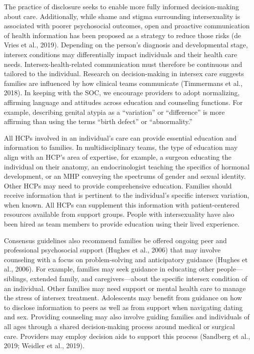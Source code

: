 \documentclass[
]{book}
\begin{document}
The practice of disclosure seeks to enable more
fully informed decision-making about care.
Additionally, while shame and stigma surrounding intersexuality is associated with poorer psychosocial outcomes, open and proactive
communication of health information has been
proposed as a strategy to reduce those risks (de
Vries et al., 2019). Depending on the person's
diagnosis and developmental stage, intersex conditions may differentially impact individuals and
their health care needs. Intersex-health-related
communication must therefore be continuous and
tailored to the individual. Research on
decision-making in intersex care suggests families
are influenced by how clinical teams communicate (Timmermans et al., 2018). In keeping with
the SOC, we encourage providers to adopt normalizing, affirming language and attitudes across
education and counseling functions. For example,
describing genital atypia as a ``variation'' or ``difference'' is more affirming than using the terms
``birth defect'' or ``abnormality.''

All HCPs involved in an individual's care can
provide essential education and information to
families. In multidisciplinary teams, the type of
education may align with an HCP's area of
expertise, for example, a surgeon educating the
individual on their anatomy, an endocrinologist
teaching the specifics of hormonal development,
or an MHP conveying the spectrums of gender
and sexual identity. Other HCPs may need to
provide comprehensive education. Families
should receive information that is pertinent to
the individual's specific intersex variation, when
known. All HCPs can supplement this information with patient-centered resources available
from support groups. People with intersexuality
have also been hired as team members to provide education using their lived experience.

Consensus guidelines also recommend families
be offered ongoing peer and professional psychosocial support (Hughes et al., 2006) that may
involve counseling with a focus on problem-solving
and anticipatory guidance (Hughes et al., 2006).
For example, families may seek guidance in educating other people---siblings, extended family,
and caregivers---about the specific intersex condition of an individual. Other families may need
support or mental health care to manage the
stress of intersex treatment. Adolescents may benefit from guidance on how to disclose information to peers as well as from support when
navigating dating and sex. Providing counseling
may also involve guiding families and individuals
of all ages through a shared decision-making process around medical or surgical care. Providers
may employ decision aids to support this process
(Sandberg et al., 2019; Weidler et al., 2019).
\end{document}
